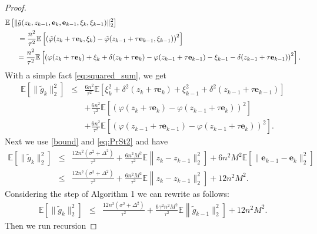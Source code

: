 \documentclass[runningheads]{llncs}
\begin{document}
\begin{proof}
\begin{eqnarray*}
    \mathbb{E}\left[\|\tilde g(z_k, z_{k-1},  \mathbf{e}_k, \mathbf{e}_{k-1},  \xi_k, \xi_{k-1})\|^2_2\right] \hspace{9cm}\nonumber\\
    = \frac{n^2}{\tau^2}\mathbb{E}\left[\left(\tilde \varphi(z_k + \tau \mathbf{e}_k,  \xi_k) -  \tilde \varphi(z_{k-1} + \tau \mathbf{e}_{k-1},  \xi_{k-1})\right)^2\right] \hspace{5.75cm}\nonumber\\
    = \frac{n^2}{\tau^2}\mathbb{E}\left[\left(\varphi(z_k + \tau \mathbf{e}_k) + \xi_k + \delta(z_k + \tau \mathbf{e}_k) -  \varphi(z_{k-1} + \tau \mathbf{e}_{k-1}) -  \xi_{k-1} - \delta(z_{k-1} + \tau \mathbf{e}_{k-1})\right)^2\right]. 
\end{eqnarray*}
With a simple fact \eqref{eq:squared_sum}, we get
\begin{eqnarray*}
    \mathbb{E}\left[\|\tilde g_k\|^2_2\right] &\leq& \frac{6n^2}{\tau^2}\mathbb{E}\left[\xi^2_k + \delta^2(z_k + \tau \mathbf{e}_k) + \xi^2_{k-1} + \delta^2(z_{k-1} + \tau \mathbf{e}_{k-1})\right]\nonumber\\
    &&+ \frac{6n^2}{\tau^2}\mathbb{E}\left[(\varphi(z_k + \tau \mathbf{e}_k) - \varphi(z_{k-1} + \tau \mathbf{e}_k))^2 \right]\nonumber\\
    &&+ \frac{6n^2}{\tau^2}\mathbb{E}\left[(\varphi(z_{k-1} + \tau \mathbf{e}_{k-1}) - \varphi(z_{k-1} + \tau \mathbf{e}_k))^2 \right]. 
\end{eqnarray*}
Next we use \eqref{bound} and \eqref{eq:PrSt2} and have
\begin{eqnarray*}
    \mathbb{E}\left[\|\tilde g_k\|^2_2\right] &\leq& \frac{12n^2 (\sigma^2 + \Delta^2)}{\tau^2}+ \frac{6n^2M^2}{\tau^2}\mathbb{E}\left\|z_k - z_{k-1}\|^2_2 \right]+ 6n^2M^2\mathbb{E}\left[\|\mathbf{e}_{k-1} - \mathbf{e}_k\|^2_2 \right] \nonumber\\
    &\leq& \frac{12n^2 (\sigma^2 + \Delta^2)}{\tau^2}+ \frac{6n^2M^2}{\tau^2}\mathbb{E}\left\|z_k - z_{k-1}\|^2_2 \right]+ 12n^2M^2. 
\end{eqnarray*}
Considering the step of Algorithm 1 we can rewrite as follows:
\begin{eqnarray*}
    \mathbb{E}\left[\|\tilde g_k\|^2_2\right] 
    &\leq& \frac{12n^2 (\sigma^2 + \Delta^2)}{\tau^2}+ \frac{6\gamma^2 n^2M^2}{\tau^2}\mathbb{E}\left\|\tilde g_{k-1}\|^2_2 \right]+ 12n^2M^2. 
\end{eqnarray*}
Then we run recursion

\end{proof}
\end{document}
